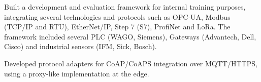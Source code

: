 \begin{cventries}
{\begin{cvitems}
        \item {Built a development and evaluation framework for internal training purposes, integrating several technologies and protocols such as OPC-UA, Modbus (TCP/IP and RTU), EtherNet/IP, Step 7 (S7), ProfiNet and LoRa. The framework included several PLC (WAGO, Siemens), Gateways (Advantech, Dell, Cisco) and industrial sensors (IFM, Sick, Bosch).}
        \item {Developed protocol adapters for CoAP/CoAPS integration over MQTT/HTTPS, using a proxy-like implementation at the edge.}
      \end{cvitems}
    }


  \cventry %
    {}
    {}
    {}
    {}
    {}

\end{cventries}


